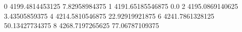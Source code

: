 0 4199.4814453125 7.82958984375
1 4191.65185546875 0.0
2 4195.0869140625 3.43505859375
4 4214.5810546875 22.92919921875
6 4241.7861328125 50.13427734375
8 4268.7197265625 77.06787109375
